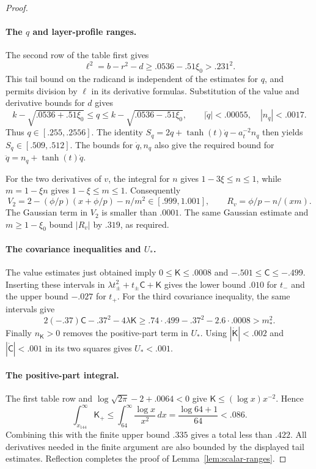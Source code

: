 \begin{proof}
\paragraph{The \(q\) and layer-profile ranges.}
The second row of the table first gives
\[
 \ell^2=b-r^2-d\ge.0536-.51\xi_0>.231^2.
\]
This tail bound on the radicand is independent of the estimates for
\(q\), and permits division by \(\ell\) in its derivative formulas.
Substitution of the value and derivative bounds for \(d\) gives
\[
 k-\sqrt{.0536+.51\xi_0}\le q\le k-\sqrt{.0536-.51\xi_0},\qquad
 |\dot q|<.00055,\quad |n_q|<.0017.
\]
Thus \(q\in[.255,.2556]\). The identity
\(S_q=2q+\tanh(t)\dot q-a_t^{-2}n_q\) then yields
\(S_q\in[.509,.512]\). The bounds for \(\dot q,n_q\) also give
the required bound for \(\ddot q=n_q+\tanh(t)\dot q\).

For the two derivatives of \(v\), the integral for \(n\) gives
\(1-3\xi\le n\le1\), while \(m=1-\xi n\) gives
\(1-\xi\le m\le1\). Consequently
\[
 V_2=2-(\phi/p)(x+\phi/p)-n/m^2\in[.999,1.001],
 \qquad R_v=\phi/p-n/(xm).
\]
The Gaussian term in \(V_2\) is smaller than \(.0001\).
The same Gaussian estimate and \(m\ge1-\xi_0\) bound \(|R_v|\)
by \(.319\), as required.

\paragraph{The covariance inequalities and \(U_*\).}
The value estimates just obtained imply
\(0\le\mathsf K\le.0008\) and
\(-.501\le\mathsf C\le-.499\).
Inserting these intervals in
\(\lambda t_\pm^2+t_\pm\mathsf C+\mathsf K\) gives the lower bound
\(.010\) for \(t_-\) and the upper bound \(-.027\) for \(t_+\).
For the third covariance inequality, the same intervals give
\[
 2(-.37)\mathsf C-.37^2-4\lambda\mathsf K
 \ge.74\cdot.499-.37^2-2.6\cdot.0008>m_*^2.
\]
Finally \(n_{\mathsf K}>0\) removes the positive-part term in \(U_*\).
Using \(|\dot{\mathsf K}|<.002\) and
\(|\dot{\mathsf C}|<.001\) in its two squares gives \(U_*<.001\).

\paragraph{The positive-part integral.}
The first table row and
\(\log\sqrt{2\pi}-2+.0064<0\) give
\(\mathsf K\le(\log x)x^{-2}\). Hence
\[
 \int_{x_{144}}^\infty\mathsf K_+
 \le\int_{64}^\infty\frac{\log x}{x^2}\,dx
 =\frac{\log64+1}{64}<.086.
\]
Combining this with the finite upper bound \(.335\) gives a total
less than \(.422\). All derivatives needed in the finite argument
are also bounded by the displayed tail estimates. Reflection completes
the proof of Lemma~\ref{lem:scalar-ranges}.
\end{proof}

